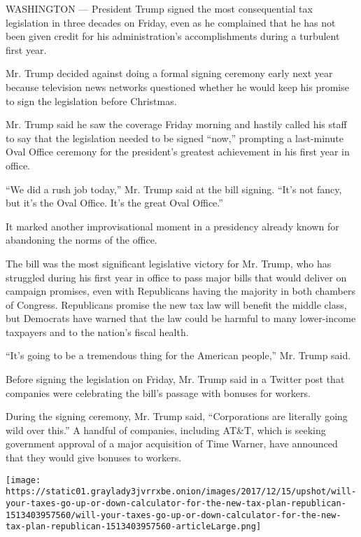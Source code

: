 WASHINGTON --- President Trump signed the most consequential tax
legislation in three decades on Friday, even as he complained that he
has not been given credit for his administration's accomplishments
during a turbulent first year.

Mr. Trump decided against doing a formal signing ceremony early next
year because television news networks questioned whether he would keep
his promise to sign the legislation before Christmas.

Mr. Trump said he saw the coverage Friday morning and hastily called his
staff to say that the legislation needed to be signed ``now,'' prompting
a last-minute Oval Office ceremony for the president's greatest
achievement in his first year in office.

``We did a rush job today,'' Mr. Trump said at the bill signing. ``It's
not fancy, but it's the Oval Office. It's the great Oval Office.''

It marked another improvisational moment in a presidency already known
for abandoning the norms of the office.

The bill was the most significant legislative victory for Mr. Trump, who
has struggled during his first year in office to pass major bills that
would deliver on campaign promises, even with Republicans having the
majority in both chambers of Congress. Republicans promise the new tax
law will benefit the middle class, but Democrats have warned that the
law could be harmful to many lower-income taxpayers and to the nation's
fiscal health.

``It's going to be a tremendous thing for the American people,'' Mr.
Trump said.

Before signing the legislation on Friday, Mr. Trump said in a Twitter
post that companies were celebrating the bill's passage with bonuses for
workers.

During the signing ceremony, Mr. Trump said, ``Corporations are
literally going wild over this.'' A handful of companies, including
AT\&T, which is seeking government approval of a major acquisition of
Time Warner, have announced that they would give bonuses to workers.

\href{https://www.nytimes3xbfgragh.onion/interactive/2017/12/17/upshot/tax-calculator.html}{}

\texttt{[image: https://static01.graylady3jvrrxbe.onion/images/2017/12/15/upshot/will-your-taxes-go-up-or-down-calculator-for-the-new-tax-plan-republican-1513403957560/will-your-taxes-go-up-or-down-calculator-for-the-new-tax-plan-republican-1513403957560-articleLarge.png]}

